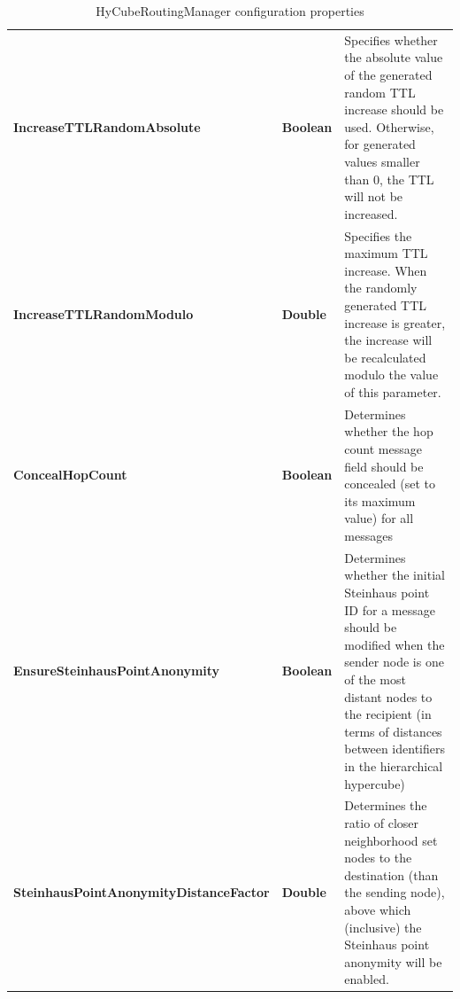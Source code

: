 \begin{table}
\begin{center}
\begin{tabular}{p{5cm} p{1.5cm} p{8cm}}
	\textbf{IncreaseTTLRandomAbsolute}		& \textbf{Boolean}				& Specifies whether the absolute value of the generated random TTL increase should be used. Otherwise, for generated values smaller than 0, the TTL will not be increased.		\\[1.5mm]
	\textbf{IncreaseTTLRandomModulo}		& \textbf{Double}				& Specifies the maximum TTL increase. When the randomly generated TTL increase is greater, the increase will be recalculated modulo the value of this parameter.		\\[1.5mm]
	\textbf{ConcealHopCount}				& \textbf{Boolean}				& Determines whether the hop count message field should be concealed (set to its maximum value) for all messages		\\[1.5mm]
	\textbf{EnsureSteinhausPointAnonymity}	& \textbf{Boolean}				& Determines whether the initial Steinhaus point ID for a message should be modified when the sender node is one of the most distant nodes to the recipient (in terms of distances between identifiers in the hierarchical hypercube)	\\[1.5mm]
	\textbf{SteinhausPointAnonymityDistanceFactor}	& \textbf{Double}				& Determines the ratio of closer neighborhood set nodes to the destination (than the sending node), above which (inclusive) the Steinhaus point anonymity will be enabled.		\\[1.5mm]
    \hline
\end{tabular}
\end{center}
\caption{HyCubeRoutingManager configuration properties}
\label{tab:libHyCubeRoutingManager}
\end{table}

